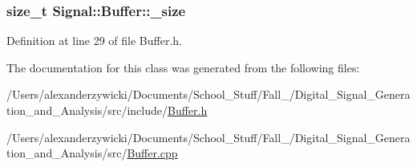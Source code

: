 \hypertarget{classSignal_1_1Buffer_ab4c8969e972323306ee51538ad70577b}{
\subsubsection[{\+\_\+size}]{\setlength{\rightskip}{0pt plus 5cm}size\+\_\+t Signal\+::\+Buffer\+::\+\_\+size\hspace{0.3cm}{\ttfamily [protected]}}}\label{classSignal_1_1Buffer_ab4c8969e972323306ee51538ad70577b}


Definition at line 29 of file Buffer.\+h.



The documentation for this class was generated from the following files\+:\begin{DoxyCompactItemize}
\item 
/\+Users/alexanderzywicki/\+Documents/\+School\+\_\+\+Stuff/\+Fall\+\_/\+Digital\+\_\+\+Signal\+\_\+\+Generation\+\_\+and\+\_\+\+Analysis/src/include/\hyperlink{Buffer_8h}{Buffer.\+h}\item 
/\+Users/alexanderzywicki/\+Documents/\+School\+\_\+\+Stuff/\+Fall\+\_/\+Digital\+\_\+\+Signal\+\_\+\+Generation\+\_\+and\+\_\+\+Analysis/src/\hyperlink{Buffer_8cpp}{Buffer.\+cpp}\end{DoxyCompactItemize}
